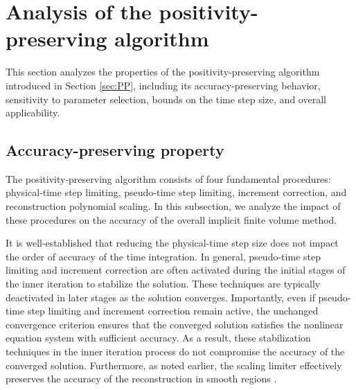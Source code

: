 \begingroup
\color{r2color}

\section{Analysis of the positivity-preserving algorithm}

This section analyzes the properties of the positivity-preserving algorithm introduced in Section \ref{sec:PP}, including its accuracy-preserving behavior, sensitivity to parameter selection, bounds on the time step size, and overall applicability.

\subsection{Accuracy-preserving property}

The positivity-preserving algorithm consists of four fundamental procedures: physical-time step limiting, pseudo-time step limiting, increment correction, and reconstruction polynomial scaling. In this subsection, we analyze the impact of these procedures on the accuracy of the overall implicit finite volume method.

It is well-established that reducing the physical-time step size does not impact the order of accuracy of the time integration.
In general, pseudo-time step limiting and increment correction are often activated during the initial stages of the inner iteration to stabilize the solution. These techniques are typically deactivated in later stages as the solution converges. Importantly, even if pseudo-time step limiting and increment correction remain active, the unchanged convergence criterion ensures that the converged solution satisfies the nonlinear equation system with sufficient accuracy. As a result, these stabilization techniques in the inner iteration process do not compromise the accuracy of the converged solution.
Furthermore, as noted earlier, the scaling limiter effectively preserves the 
accuracy of the reconstruction in smooth regions \cite{zhang2010positivity}.


